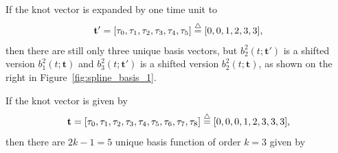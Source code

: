 If the knot vector is expanded by one time unit to
\[
\mathbf{t}' = [\tau_0, \tau_1, \tau_2, \tau_3, \tau_4, \tau_5] \stackrel{\triangle}{=} [0, 0, 1, 2, 3, 3],
\]
then there are still only three unique basis vectors, but 
$b_2^2(t; \mathbf{t}')$ is a shifted version $b_1^2(t; \mathbf{t})$ and $b_3^2(t; \mathbf{t}')$ is a shifted version $b_2^2(t; \mathbf{t})$, as shown on the right in Figure~\ref{fig:spline_basis_1}.

\clearpage


\par{}

If the knot vector is given by
\[
\mathbf{t} = [\tau_0, \tau_1, \tau_2, \tau_3, \tau_4, \tau_5, \tau_6, \tau_7, \tau_8] \stackrel{\triangle}{=} [0, 0, 0, 1, 2, 3, 3, 3],
\]
then there are $2k-1=5$ unique basis function of order $k=3$ given by
